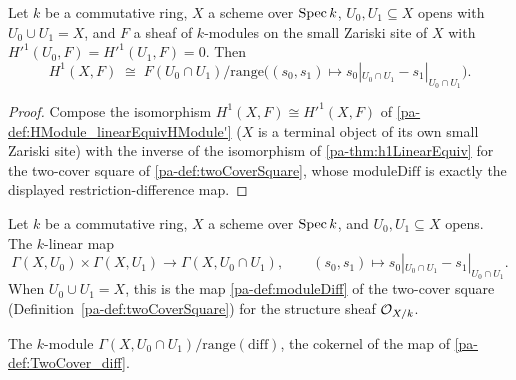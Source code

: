 \begin{theorem}
  \label{pa-thm:twoCoverH1LinearEquiv}
  \leanok

  Let \(k\) be a commutative ring, \(X\) a scheme over \(\operatorname{Spec} k\), \(U_0, U_1 \subseteq X\)
  opens with \(U_0 \cup U_1 = X\), and \(F\) a sheaf of \(k\)-modules on the small Zariski
  site of \(X\) with \(H'^1(U_0,F) = H'^1(U_1,F) = 0\). Then
  \[
    H^1(X,F) \;\cong\;
      F(U_0 \cap U_1) \big/ \mathrm{range}\bigl((s_0,s_1) \mapsto
        s_0|_{U_0 \cap U_1} - s_1|_{U_0 \cap U_1}\bigr) .
  \]
\end{theorem}
\begin{proof}
  \leanok
  Compose the isomorphism \(H^1(X,F) \cong H'^1(X,F)\) of
  \ref{pa-def:HModule_linearEquivHModule'} (\(X\) is a terminal object of its own small Zariski
  site) with the inverse of the isomorphism of \ref{pa-thm:h1LinearEquiv} for the two-cover
  square of \ref{pa-def:twoCoverSquare}, whose \(\mathrm{moduleDiff}\) is exactly the displayed
  restriction-difference map.
\end{proof}

\begin{definition}
  \label{pa-def:TwoCover_diff}
  \leanok

  Let \(k\) be a commutative ring, \(X\) a scheme over \(\operatorname{Spec} k\), and \(U_0, U_1 \subseteq X\)
  opens. The \(k\)-linear map
  \[
    \Gamma(X,U_0) \times \Gamma(X,U_1) \longrightarrow \Gamma(X, U_0 \cap U_1), \qquad
    (s_0,s_1) \longmapsto s_0|_{U_0 \cap U_1} - s_1|_{U_0 \cap U_1} .
  \]
  When \(U_0 \cup U_1 = X\), this is the map \ref{pa-def:moduleDiff} of the two-cover square
  (Definition~\ref{pa-def:twoCoverSquare}) for the structure sheaf \(\mathcal{O}_{X/k}\).
\end{definition}

\begin{definition}
  \label{pa-def:TwoCover_H1Cok}
  \leanok

  The \(k\)-module \(\Gamma(X, U_0 \cap U_1)/\mathrm{range}(\mathrm{diff})\), the cokernel of
  the map of \ref{pa-def:TwoCover_diff}.
\end{definition}


